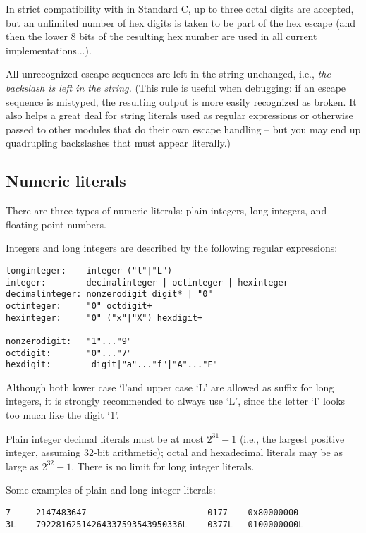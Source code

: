 In strict compatibility with in Standard C, up to three octal digits are
accepted, but an unlimited number of hex digits is taken to be part of
the hex escape (and then the lower 8 bits of the resulting hex number
are used in all current implementations...).

All unrecognized escape sequences are left in the string unchanged,
i.e., {\em the backslash is left in the string.}  (This rule is
useful when debugging: if an escape sequence is mistyped, the
resulting output is more easily recognized as broken.  It also helps a
great deal for string literals used as regular expressions or
otherwise passed to other modules that do their own escape handling --
but you may end up quadrupling backslashes that must appear literally.)

\subsection{Numeric literals}

There are three types of numeric literals: plain integers, long
integers, and floating point numbers.

Integers and long integers are described by the following regular expressions:

\begin{verbatim}
longinteger:    integer ("l"|"L")
integer:        decimalinteger | octinteger | hexinteger
decimalinteger: nonzerodigit digit* | "0"
octinteger:     "0" octdigit+
hexinteger:     "0" ("x"|"X") hexdigit+

nonzerodigit:   "1"..."9"
octdigit:       "0"..."7"
hexdigit:        digit|"a"..."f"|"A"..."F"
\end{verbatim}

Although both lower case `l'and upper case `L' are allowed as suffix
for long integers, it is strongly recommended to always use `L', since
the letter `l' looks too much like the digit `1'.

Plain integer decimal literals must be at most $2^{31} - 1$ (i.e., the
largest positive integer, assuming 32-bit arithmetic); octal and
hexadecimal literals may be as large as $2^{32} - 1$.  There is no limit
for long integer literals.

Some examples of plain and long integer literals:

\begin{verbatim}
7     2147483647                        0177    0x80000000
3L    79228162514264337593543950336L    0377L   0100000000L
\end{verbatim}


